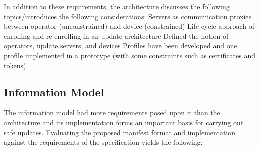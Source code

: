 \documentclass[0-thesis.tex]{subfiles}
\begin{document}
In addition to these requirements, the architecture discusses the following
topics/introduces the following considerations:
Servers as communication proxies between operator (unconstrained) and device (constrained)
Life cycle approach of enrolling and re-enrolling in an update architecture
Defined the notion of operators, update servers, and devices
Profiles have been developed and one profile implemented in a prototype (with some
constraints such as certificates and tokens)
  
\subsection{Information Model}
\label{ssec:information-evaluation}
The information model had more requirements posed upon it than the architecture and its
implementation forms an important basis for carrying out safe updates. Evaluating the
proposed manifest format and implementation against the requirements of the specification
yields the following:
\end{document}
